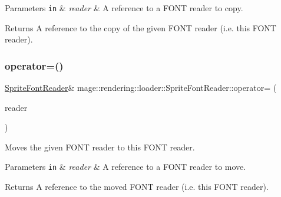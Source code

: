 \begin{DoxyParams}[1]{Parameters}
\mbox{\tt in}  & {\em reader} & A reference to a F\+O\+NT reader to copy. \\
\hline
\end{DoxyParams}
\begin{DoxyReturn}{Returns}
A reference to the copy of the given F\+O\+NT reader (i.\+e. this F\+O\+NT reader). 
\end{DoxyReturn}
\hypertarget{classmage_1_1rendering_1_1loader_1_1_sprite_font_reader_ac6902b3475ae8425d475de59135a11a3}{}\label{classmage_1_1rendering_1_1loader_1_1_sprite_font_reader_ac6902b3475ae8425d475de59135a11a3} 
\subsubsection{\texorpdfstring{operator=()}{operator=()}\hspace{0.1cm}{\footnotesize\ttfamily [2/2]}}
{\footnotesize\ttfamily \hyperlink{classmage_1_1rendering_1_1loader_1_1_sprite_font_reader}{Sprite\+Font\+Reader}\& mage\+::rendering\+::loader\+::\+Sprite\+Font\+Reader\+::operator= (\begin{DoxyParamCaption}\item[{\hyperlink{classmage_1_1rendering_1_1loader_1_1_sprite_font_reader}{Sprite\+Font\+Reader} \&\&}]{reader }\end{DoxyParamCaption})\hspace{0.3cm}{\ttfamily [delete]}}

Moves the given F\+O\+NT reader to this F\+O\+NT reader.


\begin{DoxyParams}[1]{Parameters}
\mbox{\tt in}  & {\em reader} & A reference to a F\+O\+NT reader to move. \\
\hline
\end{DoxyParams}
\begin{DoxyReturn}{Returns}
A reference to the moved F\+O\+NT reader (i.\+e. this F\+O\+NT reader). 
\end{DoxyReturn}
\hypertarget{classmage_1_1rendering_1_1loader_1_1_sprite_font_reader_ae5b827dade3bd800e2000788efa91e30}{}\label{classmage_1_1rendering_1_1loader_1_1_sprite_font_reader_ae5b827dade3bd800e2000788efa91e30} 
